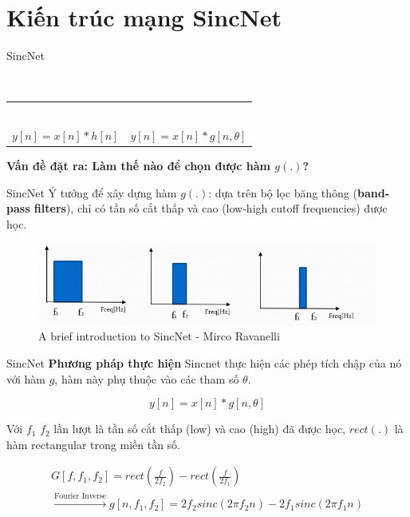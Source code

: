 \documentclass[notheorems, aspectratio=54]{beamer}
\begin{document}
\section{Kiến trúc mạng SincNet}
\begin{frame}{SincNet}
	\begin{block}{~\vspace{0.7cm}}
		\begin{center}
			\vspace{-0.8cm}
			\begin{tabular}{p{0.45\textwidth}|p{}}
				\textcolor{white}{\bf Standard CNN} & \textcolor{white}{\bf SincNet} \\\\
				 $y[n] = x[n] * h[n]$ & $y[n] = x[n] * g[n, \theta]$\\
			\end{tabular}
		\end{center}
	\end{block}
	\textbf{Vấn đề đặt ra: Làm thế nào để chọn được hàm $g(.)$?}
\end{frame}
\begin{frame}{SincNet}
	Ý tưởng để xây dựng hàm $g(.)$: dựa trên bộ lọc băng thông (\textbf{band-pass filters}), chỉ có tần số cắt thấp và cao (low-high cutoff frequencies) được học.
	\begin{figure}[H]
		\includegraphics[width=0.9\linewidth]{images/band_passfilters.png}
		\caption{A brief introduction to SincNet - Mirco Ravanelli}
		\label{fig:writing-thesis}
	\end{figure}
\end{frame}
\begin{frame}{SincNet}
	\textbf{Phương pháp thực hiện} Sincnet thực hiện các phép tích chập của nó với hàm $g$, hàm này phụ thuộc vào các tham số $\theta$.
	
	$$y[n] = x[n] * g[n, \theta]$$
	
	Với $f_1$ $f_2$ lần lượt là tần số cắt thấp (low) và cao (high) đã được học, $rect(.)$ là hàm rectangular trong miền tần số.
	
	\begin{gather*}
	G[f, f_1, f_2] = rect\left(\frac{f}{2f_2}\right) -  rect\left(\frac{f}{2f_1}\right)\\ \xrightarrow{\text{Fourier Inverse}}g[n, f_1, f_2] = 2f_2sinc(2\pi f_2 n) - 2f_1sinc(2\pi f_1 n)
	\end{gather*}
\end{frame}
\end{document}
